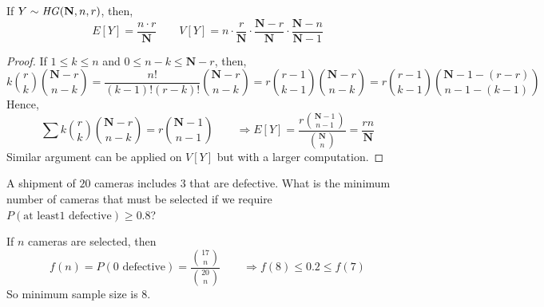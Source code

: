 \begin{theorem}
    If $Y \sim \text{\emph{HG}}(\mathbf{N}, n, r)$, then,
    \[ E[Y] = \frac{n \cdot r}{\mathbf{N}} \qquad
       V[Y] = n \cdot 
              \frac{r}{\mathbf{N}} \cdot 
              \frac{\mathbf{N} - r}{\mathbf{N}} \cdot
              \frac{\mathbf{N} - n}{\mathbf{N} - 1}                          \]
\end{theorem}
\begin{proof}
    If $1 \leq k \leq n$ and $0 \leq n - k \leq \mathbf{N} - r$, then,
    \[   k {r \choose k} {{\mathbf{N} - r} \choose {n - k}}
       = \frac{n!}{(k - 1)!(r - k)!} {{\mathbf{N} - r} \choose {n - k}}      
       = r {{r - 1} \choose {k - 1}} {{\mathbf{N} - r} \choose {n - k}}      
       = r {{r - 1} \choose {k - 1}}
         {{\mathbf{N} - 1 - (r - r)} \choose {n - 1 - (k - 1)}}              \]
    Hence,
    \[   \sum k {r \choose k} {{\mathbf{N} - r} \choose {n - k}}
       = r {{\mathbf{N} - 1} \choose {n - 1}}                                
       \qquad \Rightarrow
         E[Y]
       = \frac{r {{\mathbf{N} - 1} \choose {n - 1}}}{{\mathbf{N} \choose n}} 
       = \frac{r n}{\mathbf{N}}                                              \]
    Similar argument can be applied on $V[Y]$ but with a larger computation.
\end{proof}

\begin{example}
    A shipment of $20$ cameras includes $3$ that are defective. What is the
minimum number of cameras that must be selected if we require $P(\text{at least
} 1 \text{ defective}) \geq 0.8$?
\end{example}
\begin{solution}
    If $n$ cameras are selected, then
    \[ f(n) = P(0 \text{ defective}) = \frac{{17 \choose n}}{{20 \choose n}}  
       \qquad \Rightarrow
       f(8) \leq 0.2 \leq f(7)                                               \]
    So minimum sample size is $8$.
\end{solution}
